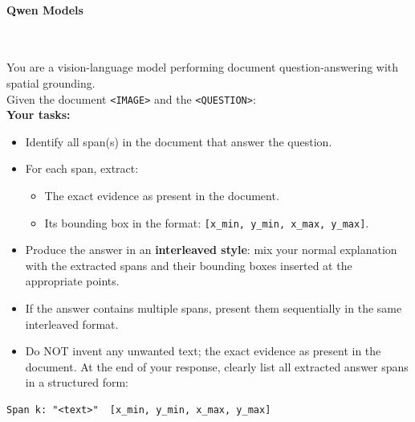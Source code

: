 \paragraph{Qwen Models}\mbox{}\\[4pt]

\begin{tcolorbox}[baseline_prompt_style, title=Qwen3-VL 8B \cite{qwen3technicalreport}]
You are a vision-language model performing document question-answering with spatial grounding. \\

Given the document \texttt{<IMAGE>} and the \texttt{<QUESTION>}: \\

\textbf{Your tasks: }
\begin{itemize}[leftmargin=10pt]   
    \item Identify all span(s) in the document that answer the question. 

    \item For each span, extract:
    \begin{itemize}
        \item The exact evidence as present in the document.
        \item Its bounding box in the format: \texttt{[x\_min, y\_min, x\_max, y\_max]}.
    \end{itemize}

    \item Produce the answer in an \textbf{interleaved style}: mix your normal explanation with the extracted spans and their bounding boxes inserted at the appropriate points.

    \item If the answer contains multiple spans, present them sequentially in the same interleaved format.

    \item Do NOT invent any unwanted text; the exact evidence as present in the document. At the end of your response, clearly list all extracted answer spans in a structured form:

\end{itemize}

\begin{verbatim}
Span k: "<text>"  [x_min, y_min, x_max, y_max]
\end{verbatim}
\end{tcolorbox}


